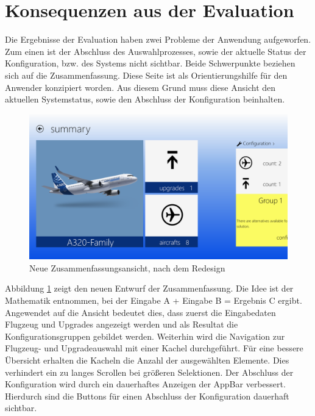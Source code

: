 \section{Konsequenzen aus der Evaluation}
Die Ergebnisse der Evaluation haben zwei Probleme der Anwendung aufgeworfen. Zum einen ist der Abschluss des Auswahlprozesses, sowie der aktuelle Status der Konfiguration, bzw. des Systems nicht sichtbar. Beide Schwerpunkte beziehen sich auf die Zusammenfassung. Diese Seite ist als Orientierungshilfe für den Anwender konzipiert worden. Aus diesem Grund muss diese Ansicht den aktuellen Systemstatus, sowie den Abschluss der Konfiguration beinhalten.  
\begin{figure}[H]
\includegraphics[width=\hsize]{images/impl/summary_impl}
\caption{Neue Zusammenfassungsansicht, nach dem Redesign}
\label{redesignSummary}
\end{figure}
Abbildung \ref{redesignSummary} zeigt den neuen Entwurf der Zusammenfassung. Die Idee ist der Mathematik entnommen, bei der Eingabe A + Eingabe B = Ergebnis C ergibt. Angewendet auf die Ansicht bedeutet dies, dass zuerst die Eingabedaten Flugzeug und Upgrades angezeigt werden und als Resultat die Konfigurationsgruppen gebildet werden. Weiterhin wird die Navigation zur Flugzeug- und Upgradeauswahl mit einer Kachel durchgeführt. Für eine bessere Übersicht erhalten die Kacheln die Anzahl der ausgewählten Elemente. Dies verhindert ein zu langes Scrollen bei größeren Selektionen. 
Der Abschluss der Konfiguration wird durch ein dauerhaftes Anzeigen der AppBar verbessert. Hierdurch sind die Buttons für einen Abschluss der Konfiguration dauerhaft sichtbar.